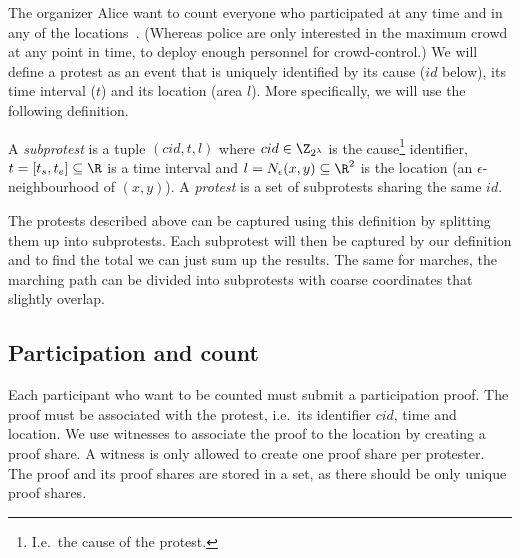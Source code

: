 
The organizer Alice want to count everyone who participated at any time and in 
any of the locations~\cite{2016DemonstrationsInSeoul}.
(Whereas police are only interested in the maximum crowd at any point in time, 
to deploy enough personnel for crowd-control.)
We will define a protest as an event that is uniquely identified by its cause 
(\(id\) below), its time interval (\(t\)) and its location (area \(l\)).
More specifically, we will use the following definition.

\begin{frame}
\begin{definition}[Protest]\label{DefProtest}
  A \emph{subprotest} is a tuple \((cid, t, l)\) where
  \(cid\in \Z_{2^\lambda}\) is the cause\footnote{%
    I.e.\ the cause of the protest.
  } identifier,
  \(t = \interval{t_s}{t_e}\subseteq \R\) is a time interval and
  \(l = N_\epsilon(x, y)\subseteq \R^2\) is the location (an 
  \(\epsilon\)-neighbourhood of \((x,y)\)).
  A \emph{protest} is a set of subprotests sharing the same \(id\).
\end{definition}
\end{frame}

The protests described above can be captured using this definition by splitting 
them up into subprotests.
Each subprotest will then be captured by our definition and to find the total 
we can just sum up the results.
The same for marches, the marching path can be divided into subprotests with 
coarse coordinates that slightly overlap.

\subsection{Participation and count}

Each participant who want to be counted must submit a participation proof.
The proof must be associated with the protest, i.e.\ its identifier \(cid\), 
time and location.
We use witnesses to associate the proof to the location by creating a proof 
share.
A witness is only allowed to create one proof share per protester.
The proof and its proof shares are stored in a set, as there should be only 
unique proof shares.

